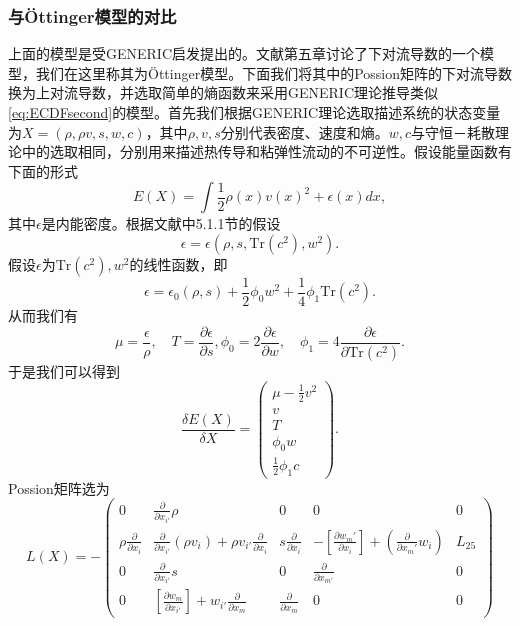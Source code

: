 	\subsubsection{与\"Ottinger模型的对比}
	上面的模型是受GENERIC启发提出的。文献\cite{ottinger2005beyond}第五章讨论了下对流导数的一个模型，我们在这里称其为\"Ottinger模型。下面我们将其中的Possion矩阵的下对流导数换为上对流导数，并选取简单的熵函数来采用GENERIC理论推导类似\eqref{eq:ECDFsecond}的模型。首先我们根据GENERIC理论选取描述系统的状态变量为$X=(\rho,\rho v, s ,w ,c)$，其中$\rho,v,s$分别代表密度、速度和熵。$w,c$与守恒－耗散理论中的选取相同，分别用来描述热传导和粘弹性流动的不可逆性。假设能量函数有下面的形式
	\begin{equation*}
		E(X) =	\int \frac{1}{2} \rho(x) v(x)^2 + \epsilon(x) dx,
	\end{equation*}
	其中$\epsilon$是内能密度。根据文献\cite{ottinger2005beyond}中5.1.1节的假设
	\begin{equation*}
		\epsilon = \epsilon (\rho,s,\mbox{Tr}(c^2),w^2) .
	\end{equation*}
	假设$\epsilon$为$\mbox{Tr}(c^2),w^2$的线性函数，即
	\begin{equation*}
		\epsilon = \epsilon_0(\rho,s) + \frac{1}{2} \phi_0 w^2  + \frac{1}{4} \phi_1 \mbox{Tr}(c^2) .
	\end{equation*}
	从而我们有
	\begin{equation*}
		\mu = \frac{\epsilon}{\rho},\quad T = \frac{\partial \epsilon}{\partial s}, \phi_0 = 2 \frac{\partial \epsilon}{\partial w}, \quad \phi_1 = 4 \frac{\partial \epsilon}{\partial \mbox{Tr}(c^2)}.
	\end{equation*}
	于是我们可以得到
	\begin{equation*}
		\frac{\delta E(X)}{ \delta X} = \left( \begin{array}{c} \mu - \frac{1}{2} v^2 \\ v \\ T \\ \phi_0 w \\ \frac{1}{2} \phi_1 c \end{array} \right).
	\end{equation*}
	Possion矩阵选为
	\begin{equation*}
		L(X) = -\left( \begin{array}{ccccc}
		0 & \frac{\partial}{\partial {x_{i'}}} \rho & 0 & 0 & 0 \\
		\rho \frac{\partial}{\partial {x_i}} & \frac{\partial}{\partial {x_{i'}}} ({\rho v_i}) + \rho v_{i'} \frac{\partial}{\partial {x_i}} & s \frac{\partial}{\partial {x_i}} & -[\frac{\partial w_m'}{\partial x_i}] + (\frac{\partial}{\partial {x_m'}} w_i) & L_{25} \\
		0 &　\frac{\partial}{\partial x_{i'}} s & 0 & \frac{\partial }{\partial x_{m'}} & 0 \\
		0 & [\frac{\partial w_m}{\partial x_{i'}}] + w_{i'} \frac{\partial}{\partial x_{m}} & \frac{\partial}{\partial {x_m}} & 0 & 0 　
		\end{array}\right)
	\end{equation*}

